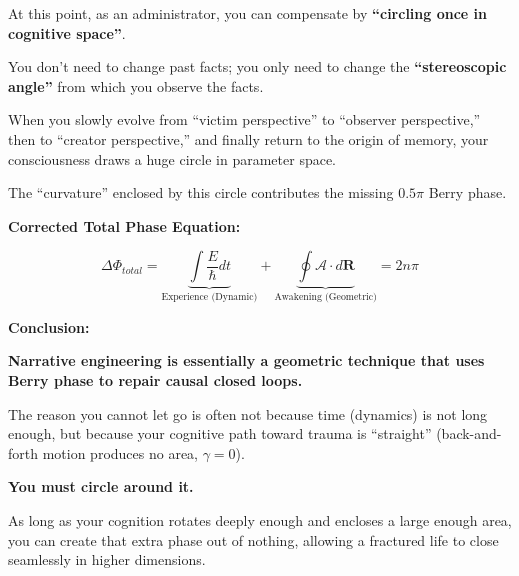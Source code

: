 At this point, as an administrator, you can compensate by \textbf{``circling once in cognitive space''}.

You don't need to change past facts; you only need to change the \textbf{``stereoscopic angle''} from which you observe the facts.

When you slowly evolve from ``victim perspective'' to ``observer perspective,'' then to ``creator perspective,'' and finally return to the origin of memory, your consciousness draws a huge circle in parameter space.

The ``curvature'' enclosed by this circle contributes the missing $0.5\pi$ Berry phase.

\textbf{Corrected Total Phase Equation:}

\[\Delta \Phi_{total} = \underbrace{\int \frac{E}{\hbar} dt}_{\text{Experience (Dynamic)}} + \underbrace{\oint \mathcal{A} \cdot d\mathbf{R}}_{\text{Awakening (Geometric)}} = 2n\pi\]

\textbf{Conclusion:}

\textbf{Narrative engineering is essentially a geometric technique that uses Berry phase to repair causal closed loops.}

The reason you cannot let go is often not because time (dynamics) is not long enough, but because your cognitive path toward trauma is ``straight'' (back-and-forth motion produces no area, $\gamma=0$).

\textbf{You must circle around it.}

As long as your cognition rotates deeply enough and encloses a large enough area, you can create that extra phase out of nothing, allowing a fractured life to close seamlessly in higher dimensions.

